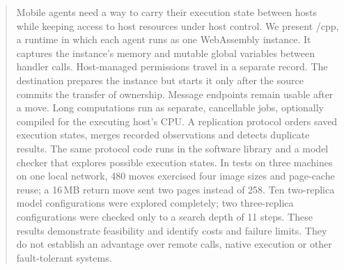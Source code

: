 
\begin{abstract}
Mobile agents need a way to carry their execution state between hosts
while keeping access to host resources under host control. We present
\paglets{}/cpp, a runtime in which each agent runs as one WebAssembly
instance. It captures the instance's memory and mutable global variables
between handler calls. Host-managed permissions travel in a separate
record. The destination prepares the instance but starts it only after
the source commits the transfer of ownership. Message endpoints remain
usable after a move. Long computations run as separate, cancellable jobs,
optionally compiled for the executing host's CPU. A replication protocol
orders saved execution states, merges recorded observations and detects
duplicate results. The same protocol code runs in the software library
and a model checker that explores possible execution states. In tests on
three machines on one local network, 480 moves exercised four image sizes
and page-cache reuse; a 16\,MB return move sent two pages instead of 258.
Ten two-replica model configurations were explored completely; two
three-replica configurations were checked only to a search depth of
11 steps. These results
demonstrate feasibility and identify costs and failure limits. They do
not establish an advantage over remote calls, native execution or other
fault-tolerant systems.
\end{abstract}
